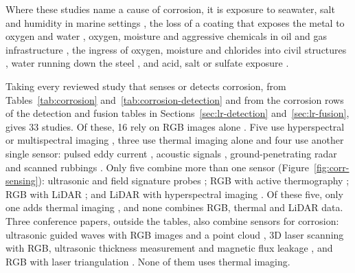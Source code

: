 Where these studies name a cause of corrosion, it is exposure to seawater, salt
and humidity in marine settings
\citep{Hernndez-Surez2026,Arias2025,Fu2024,Imran2025,PallasEnguita2025}, the loss
of a coating that exposes the metal to oxygen and water \citep{Hu2023}, oxygen,
moisture and aggressive chemicals in oil and gas infrastructure \citep{Alvani2026},
the ingress of oxygen, moisture and chlorides into civil structures \citep{Bui2026},
water running down the steel \citep{Savino2025}, and acid, salt or sulfate
exposure \citep{Lavadiya2022}.

Taking every reviewed study that senses or detects corrosion, from
Tables~\ref{tab:corrosion} and~\ref{tab:corrosion-detection} and from the
corrosion rows of the detection and fusion tables in
Sections~\ref{sec:lr-detection} and~\ref{sec:lr-fusion}, gives 33 studies. Of
these, 16 rely on RGB images alone
\citep{Malashin2024,Mao2026,Espinoza2026,Fu2024,Alvani2026,Imran2025,Yao2019,Nash2022,Savino2025,Maharjan2025,Li2024b,Suzuki2026,Rahman2021,Hu2023,Yu2023,HerndonTien2025}.
Five use hyperspectral or multispectral imaging \citep{Egodawela2025,DeKerf2022,Arias2025,Lavadiya2022,Hernndez-Surez2026}, three use
thermal imaging alone \citep{Elizalde2023,Doshvarpassand2022,Liu2021} and four use another single sensor: pulsed
eddy current \citep{Yang2025}, acoustic signals \citep{Yang2026a}, ground-penetrating radar \citep{Bui2026} and
scanned rubbings \citep{Khodabux2021a}. Only five combine more than one sensor (Figure~\ref{fig:corr-sensing}):
ultrasonic and field signature probes \citep{Huang2026a}; RGB with active thermography
\citep{Lim2021}; RGB with LiDAR \citep{Maru2025,PimenteldeFigueiredo2025}; and LiDAR with hyperspectral imaging
\citep{PallasEnguita2025}. Of these five, only one adds thermal imaging \citep{Lim2021}, and none combines
RGB, thermal and LiDAR data. Three conference papers, outside the tables, also
combine sensors for corrosion: ultrasonic guided waves with RGB images and a
point cloud \citep{Ding2025}, 3D laser scanning with RGB, ultrasonic thickness measurement
and magnetic flux leakage \citep{Zheng2025}, and RGB with laser triangulation \citep{Haitz2022}.
None of them uses thermal imaging.


